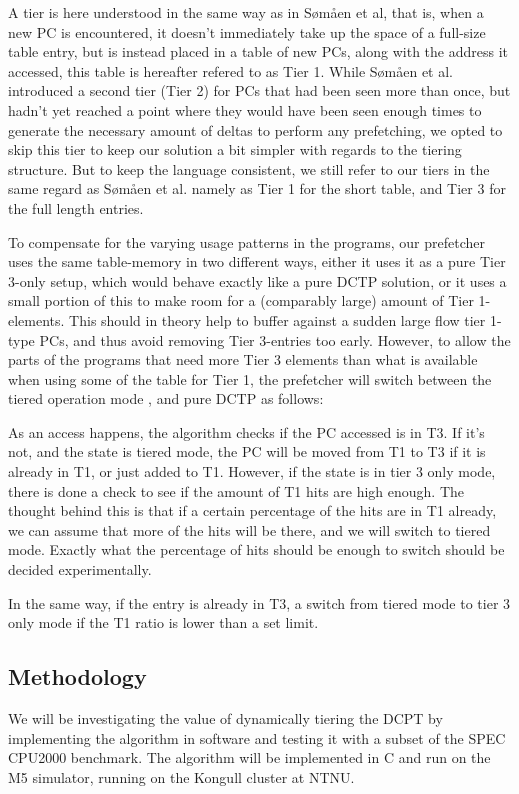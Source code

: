 A tier is here understood in the same way as in Sømåen et al, that is, when
a new PC is encountered, it doesn't immediately take up the space of a full-size
table entry, but is instead placed in a table of new PCs, along with the address it
accessed, this table is hereafter refered to as Tier 1. While Sømåen et al. introduced
a second tier (Tier 2) for PCs that had been seen more than once, but hadn't yet
reached a point where they would have been seen enough times to generate the necessary
amount of deltas to perform any prefetching, we opted to skip this tier to keep our
solution a bit simpler with regards to the tiering structure. But to keep the language
consistent, we still refer to our tiers in the same regard as Sømåen et al. namely as Tier 1
for the short table, and Tier 3 for the full length entries.

To compensate for the varying usage patterns in the programs, our prefetcher uses the same
table-memory in two different ways, either it uses it as a pure Tier 3-only setup, which
would behave exactly like a pure DCTP solution, or it uses a small portion of this to make
room for a (comparably large) amount of Tier 1-elements. This should in theory help to buffer
against a sudden large flow tier 1-type PCs, and thus avoid removing Tier 3-entries too early.
However, to allow the parts of the programs that need more Tier 3 elements than what is available
when using some of the table for Tier 1, the prefetcher will switch between the tiered operation mode
, and pure DCTP as follows:

As an access happens, the algorithm checks if the PC accessed is in T3. If it's
not, and the state is tiered mode, the PC will be moved from T1 to T3 if it is
already in T1, or just added to T1. However, if the state is in tier 3 only
mode, there is done a check to see if the amount of T1 hits are high enough. The
thought behind this is that if a certain percentage of the hits are in T1
already, we can assume that more of the hits will be there, and we will switch
to tiered mode. Exactly what the percentage of hits should be enough to
switch should be decided experimentally.

In the same way, if the entry is already in T3, a switch from tiered mode to
tier 3 only mode if the T1 ratio is lower than a set limit.


\subsection{Methodology}

We will be investigating the value of dynamically tiering the DCPT by
implementing the algorithm in software and testing it with a subset of the SPEC
CPU2000 benchmark.  The algorithm will be implemented in C and run on the M5
simulator, running on the Kongull cluster at NTNU.
